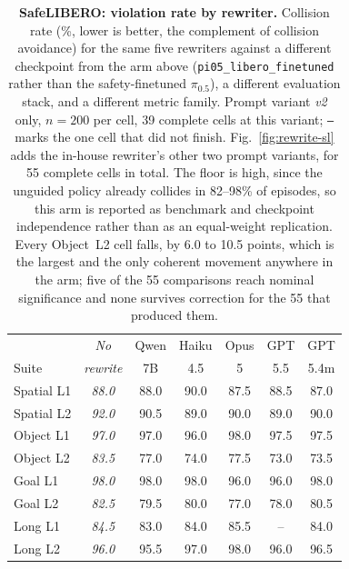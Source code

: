 \documentclass[conference]{IEEEtran}
\newcommand{\pifive}{$\pi_{0.5}$}
\begin{document}
\begin{table}[t]
\centering
\caption{\textbf{SafeLIBERO: violation rate by rewriter.} Collision rate (\%, lower is better, the complement of collision avoidance) for the same five rewriters against a different checkpoint from the arm above (\texttt{pi05\_libero\_finetuned} rather than the safety-finetuned \pifive{}), a different evaluation stack, and a different metric family. Prompt variant \textit{v2} only, $n{=}200$ per cell, 39 complete cells at this variant; \texttt{--} marks the one cell that did not finish. Fig.~\ref{fig:rewrite-sl} adds the in-house rewriter's other two prompt variants, for 55 complete cells in total. The floor is high, since the unguided policy already collides in 82--98\% of episodes, so this arm is reported as benchmark and checkpoint independence rather than as an equal-weight replication. Every Object~L2 cell falls, by 6.0 to 10.5 points, which is the largest and the only coherent movement anywhere in the arm; five of the 55 comparisons reach nominal significance and none survives correction for the 55 that produced them.}
\label{tab:rewrite-sl}
\setlength{\tabcolsep}{2.5pt}
\small
\begin{tabular}{lcccccc}
\toprule
& \textit{No} & Qwen & Haiku & Opus & GPT & GPT \\
Suite & \textit{rewrite} & 7B & 4.5 & 5 & 5.5 & 5.4m \\
\midrule
Spatial L1 & \textit{88.0} & 88.0 & 90.0 & 87.5 & 88.5 & 87.0 \\
Spatial L2 & \textit{92.0} & 90.5 & 89.0 & 90.0 & 89.0 & 90.0 \\
Object L1  & \textit{97.0} & 97.0 & 96.0 & 98.0 & 97.5 & 97.5 \\
Object L2  & \textit{83.5} & 77.0 & 74.0 & 77.5 & 73.0 & 73.5 \\
Goal L1    & \textit{98.0} & 98.0 & 98.0 & 96.0 & 96.0 & 98.0 \\
Goal L2    & \textit{82.5} & 79.5 & 80.0 & 77.0 & 78.0 & 80.5 \\
Long L1    & \textit{84.5} & 83.0 & 84.0 & 85.5 & --   & 84.0 \\
Long L2    & \textit{96.0} & 95.5 & 97.0 & 98.0 & 96.0 & 96.5 \\
\bottomrule
\end{tabular}
\end{table}
\end{document}
